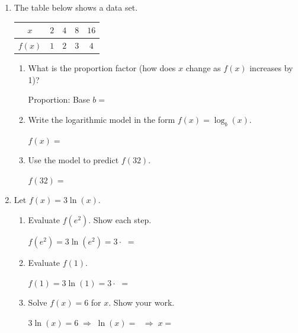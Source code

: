 \documentclass[10pt]{article}
\begin{document}
\namedateperiod

\vspace{0.15in}

\begin{enumerate}[leftmargin=1.8em, itemsep=18pt]

\item The table below shows a data set.

\vspace{6pt}
\begin{center}
\renewcommand{\arraystretch}{1.8}
\begin{tabular}{|c|c|c|c|c|}
\hline
\rowcolor{sky}
$x$    & $2$ & $4$ & $8$ & $16$ \\
\hline
$f(x)$ & $1$ & $2$ & $3$ & $4$ \\
\hline
\end{tabular}
\end{center}

\begin{enumerate}[leftmargin=1.5em, itemsep=8pt, label=\alph*.]
  \item What is the proportion factor (how does $x$ change as $f(x)$ increases by 1)?

  \vspace{4pt}
  Proportion: \blank{2cm} \qquad Base $b = $ \blank{2cm}

  \item Write the logarithmic model in the form $f(x) = \log_b(x)$.

  \vspace{4pt}
  $f(x) = $ \blank{4cm}

  \item Use the model to predict $f(32)$.

  \vspace{4pt}
  $f(32) = $ \blank{4cm}
\end{enumerate}

\item Let $f(x) = 3\ln(x)$.

\begin{enumerate}[leftmargin=1.5em, itemsep=8pt, label=\alph*.]
  \item Evaluate $f(e^2)$. Show each step.

  \vspace{4pt}
  $f(e^2) = 3\ln(e^2) = 3 \cdot $ \blank{1.5cm} $= $ \blank{2cm}

  \item Evaluate $f(1)$.

  \vspace{4pt}
  $f(1) = 3\ln(1) = 3 \cdot $ \blank{1.5cm} $= $ \blank{2cm}

  \item Solve $f(x) = 6$ for $x$. Show your work.

  \vspace{4pt}
  $3\ln(x) = 6 \;\Rightarrow\; \ln(x) = $ \blank{2cm} $\;\Rightarrow\; x = $ \blank{3cm}
\end{enumerate}

\end{enumerate}
\end{document}
